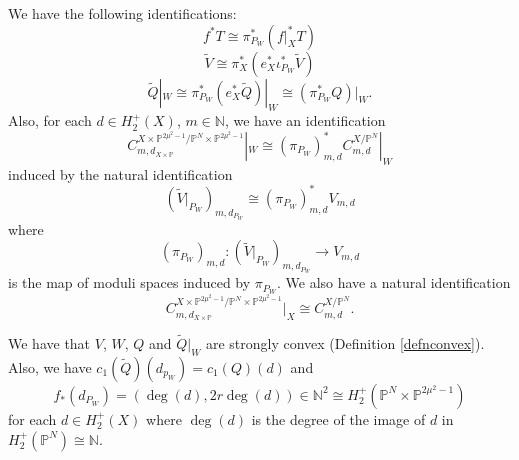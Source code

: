 \documentclass[10pt,a4paper]{amsart}
\newcommand{\bN}{\mathbb{N}}
\newcommand{\bP}{\mathbb{P}}
\begin{document}
\begin{lemma} \label{lemmapullbacks}
	We have the following identifications:
	\begin{equation} \label{eqnvectorbundlepullbackidentifications}
		f^*T \cong \pi_{P_W}^*(f|_X^*T)
	\end{equation}
	\begin{equation} \label{eqnvectorbundlepullbackidentifications2}
		\widetilde{V} \cong \pi_X^*(e_X^*\iota_{P_W}^*\widetilde{V})
	\end{equation}
	\begin{equation} \label{eqnvectorbundlepullbackidentifications3}
		\widetilde{Q}|_W \cong \pi_{P_W}^*(e_X^*\widetilde{Q})|_W \cong (\pi_{P_W}^*Q)|_W.
	\end{equation}
	Also, for each $d \in H_2^+(X)$, $m \in \bN$, we have an identification
	\begin{equation} \label{restrictionofcones}
		C^{X \times \bP^{2\mu^2-1}/\bP^N \times \bP^{2\mu^2-1}}_{m,d_{X \times \bP}}|_W \cong (\pi_{P_W})_{m,d}^*C^{X/\bP^N}_{m,d}|_W
	\end{equation}
	induced by the natural identification
	\begin{equation}
		(\widetilde{V}|_{P_W})_{m,d_{P_W}} \cong (\pi_{P_W})_{m,d}^*V_{m,d}
	\end{equation}
	where
	\begin{equation} \label{eqnidentifactionprojection}
		(\pi_{P_W})_{m,d} : (\widetilde{V}|_{P_W})_{m,d_{P_W}} \to V_{m,d}
	\end{equation}
	is the map of moduli spaces induced by $\pi_{P_W}$.
	We also have a natural identification
	\begin{equation} \label{eqnrestriction2}
		C^{X \times \bP^{2\mu^2-1}/\bP^N \times \bP^{2\mu^2-1}}_{m,d_{X \times \bP}}|_X \cong C^{X/\bP^N}_{m,d}.
	\end{equation}
\end{lemma}

\begin{lemma} \label{lemmaconvexityofbundles}
	We have that $V$, $W$, $Q$ and $\widetilde{Q}|_W$ are strongly convex (Definition \ref{defnconvex}).
	Also, we have $c_1(\widetilde{Q})(d_{p_W})=c_1(Q)(d)$ and
	\begin{equation} \label{eqnhomologyclassofcurveinproduct}
		f_*(d_{P_W}) = (\deg(d),2r\deg(d)) \in \bN^2 \cong H_2^+(\bP^N \times \bP^{2\mu^2-1})
	\end{equation}
	for each $d \in H_2^+(X)$
	where
	$\deg(d)$ is the degree of the image of $d$ in $H_2^+(\bP^N) \cong \bN$.
\end{lemma}
\end{document}
